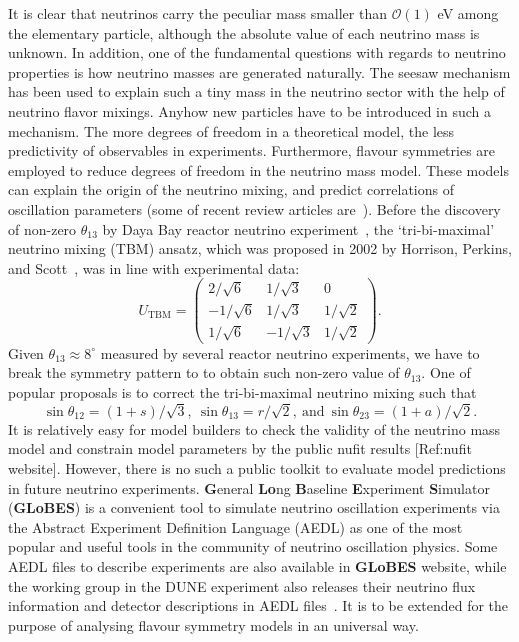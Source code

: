 \documentclass[aps,prd,nofootinbib,preprint]{revtex4}
\begin{document}
It is clear that neutrinos carry the peculiar mass smaller than $\mathcal{O}(1)$ eV among the elementary particle, although the absolute value of each neutrino mass is unknown. In addition, one of the fundamental questions with regards to neutrino properties is how neutrino masses are generated naturally. The seesaw mechanism has been used to explain such a tiny mass in the neutrino sector with the help of neutrino flavor mixings. Anyhow new particles have to be introduced in such a mechanism. The more degrees of freedom in a theoretical model, the less predictivity of observables in experiments. Furthermore, flavour symmetries are employed to reduce degrees of freedom in the neutrino mass model. These models can explain the origin of the neutrino mixing, and predict correlations of oscillation parameters (some of recent review articles are~\cite{Altarelli:2010gt,Ishimori:2010au,King:2013eh,King:2014nza,King:2015aea,King:2015ata,King:2017guk}). Before the discovery of non-zero $\theta_{13}$ by Daya Bay reactor neutrino experiment~\cite{An:2013zwz}, the `tri-bi-maximal' neutrino mixing (TBM) ansatz, which was proposed in 2002 by Horrison, Perkins, and Scott~\cite{Harrison:2002er}, was in line with experimental data:
\begin{equation*}
U_{\text{TBM}}=\left(
\begin{array}{ccc}
2/\sqrt{6} & 1/\sqrt{3} & 0\\
-1/\sqrt{6} & 1/\sqrt{3} & 1/\sqrt{2}\\
1/\sqrt{6}  & -1/\sqrt{3} & 1/\sqrt{2}
\end{array}\right).
\end{equation*} 
Given $\theta_{13}\approx 8^\circ$ measured by several reactor neutrino experiments, we have to break the symmetry pattern to to obtain such non-zero value of $\theta_{13}$. One of popular proposals is to correct the tri-bi-maximal neutrino mixing such that 
\begin{equation*}
\sin\theta_{12}=(1+s)/\sqrt{3},~\sin\theta_{13}=r/\sqrt{2},~\text{and}~\sin\theta_{23}=(1+a)/\sqrt{2}.
\end{equation*}
It is relatively easy for model builders to check the validity of the neutrino mass model and constrain model parameters by the public nufit results [Ref:nufit website]. However, there is no such a public toolkit to evaluate model predictions in future neutrino experiments. \textbf{G}eneral \textbf{Lo}ng \textbf{B}aseline \textbf{E}xperiment \textbf{S}imulator (\textbf{GLoBES}) \cite{Huber:2004ka,Huber:2007ji} is a convenient tool to simulate neutrino oscillation experiments via the Abstract Experiment Definition Language (AEDL) as one of the most popular and useful tools in the community of neutrino oscillation physics. Some AEDL files to describe experiments are also available in \textbf{GLoBES} website, while the working group in the DUNE experiment also releases their neutrino flux information and detector descriptions in AEDL files~\cite{Alion:2016uaj}. It is to be extended for the purpose of analysing flavour symmetry models in an universal way. 
\end{document}
